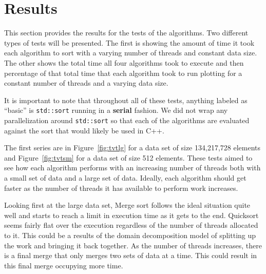 \documentclass[journal]{IEEEtran}
\begin{document}

\section{Results}
\label{sec:results}


This section provides the results for the tests of the algorithms. Two different types of tests will be presented. The first is showing the amount of time it took each algorithm to sort with a varying number of threads and constant data size. The other shows the total time all four algorithms took to execute and then percentage of that total time that each algorithm took to run plotting for a constant number of threads and a varying data size.

It is important to note that throughout all of these tests, anything labeled as ``basic'' is \texttt{std::sort} running in a \textbf{serial} fashion. We did not wrap any parallelization around \texttt{std::sort} so that each of the algorithms are evaluated against the sort that would likely be used in C++.

The first series are in Figure~\ref{fig:tvtlg} for a data set of size 134,217,728 elements and Figure~\ref{fig:tvtsm} for a data set of size 512 elements. These tests aimed to see how each algorithm performs with an increasing number of threads both with a small set of data and a large set of data. Ideally, each algorithm should get faster as the number of threads it has available to perform work increases.

Looking first at the large data set, Merge sort follows the ideal situation quite well and starts to reach a limit in execution time as it gets to the end. Quicksort seems fairly flat over the execution regardless of the number of threads allocated to it. This could be a results of the domain decomposition model of splitting up the work and bringing it back together. As the number of threads increases, there is a final merge that only merges two sets of data at a time. This could result in this final merge occupying more time. 
\end{document}
